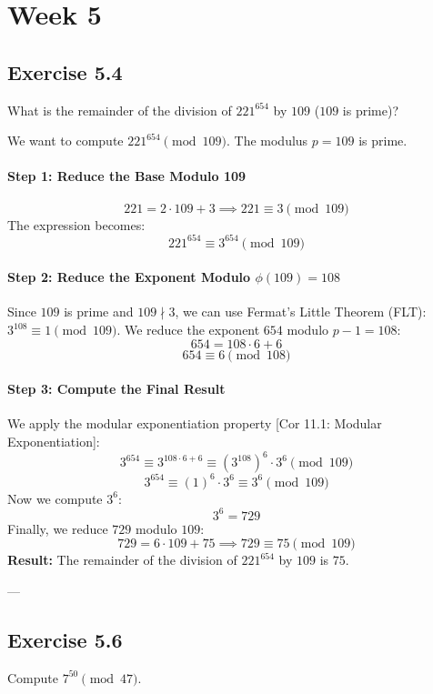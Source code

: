 \section*{Week 5}
\subsection*{Exercise 5.4}
What is the remainder of the division of $221^{654}$ by $109$ ($109$ is prime)?

\begin{solution}
We want to compute $221^{654} \pmod{109}$. The modulus $p=109$ is prime.

\paragraph{Step 1: Reduce the Base Modulo 109}
$$ 221 = 2 \cdot 109 + 3 \implies 221 \equiv 3 \pmod{109} $$
The expression becomes:
$$ 221^{654} \equiv 3^{654} \pmod{109} $$

\paragraph{Step 2: Reduce the Exponent Modulo $\phi(109)=108$}
Since $109$ is prime and $109 \nmid 3$, we can use Fermat's Little Theorem (FLT): $3^{108} \equiv 1 \pmod{109}$.
We reduce the exponent $654$ modulo $p-1 = 108$:
$$ 654 = 108 \cdot 6 + 6 $$
$$ 654 \equiv 6 \pmod{108} $$

\paragraph{Step 3: Compute the Final Result}
We apply the modular exponentiation property [Cor 11.1: Modular Exponentiation]:
$$ 3^{654} \equiv 3^{108 \cdot 6 + 6} \equiv (3^{108})^6 \cdot 3^6 \pmod{109} $$
$$ 3^{654} \equiv (1)^6 \cdot 3^6 \equiv 3^6 \pmod{109} $$
Now we compute $3^6$:
$$ 3^6 = 729 $$
Finally, we reduce $729$ modulo $109$:
$$ 729 = 6 \cdot 109 + 75 \implies 729 \equiv 75 \pmod{109} $$
\textbf{Result:} The remainder of the division of $221^{654}$ by $109$ is $75$.
\end{solution}

---
\subsection*{Exercise 5.6}
Compute $7^{50} \pmod{47}$.

